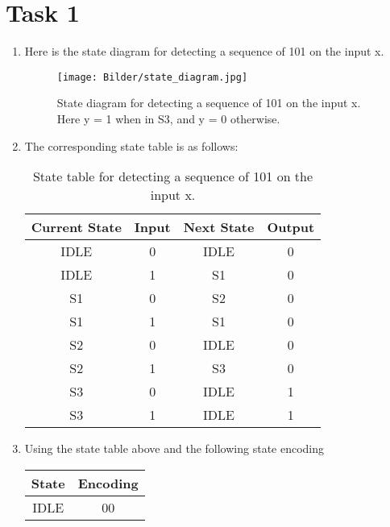 \documentclass[a4paper,11pt,norsk]{article}
\begin{document}


\section*{Task 1}
\begin{enumerate}
    \item Here is the state diagram for detecting a sequence of 101 on the input x.
        \begin{figure}[H]
            \centering
            \texttt{[image: Bilder/state\_diagram.jpg]}
            \caption{State diagram for detecting a sequence of 101 on the input x. Here y = 1 when in S3, and y = 0 otherwise.}
            \label{fig:Task1_1}
        \end{figure}
    \item The corresponding state table is as follows:
        \begin{table}[H]
            \centering
            \begin{tabular}{|c|c|c|c|}
                \hline
                \textbf{Current State} & \textbf{Input} & \textbf{Next State} & \textbf{Output} \\ \hline
                IDLE & 0 & IDLE & 0 \\ \hline
                IDLE & 1 & S1   & 0 \\ \hline
                S1   & 0 & S2   & 0 \\ \hline
                S1   & 1 & S1   & 0 \\ \hline
                S2   & 0 & IDLE & 0 \\ \hline
                S2   & 1 & S3   & 0 \\ \hline
                S3   & 0 & IDLE & 1 \\ \hline
                S3   & 1 & IDLE & 1 \\ \hline
            \end{tabular}
            \caption{State table for detecting a sequence of 101 on the input x.}
            \label{tab:Task1_2}
        \end{table}
    \item Using the state table above and the following state encoding
        \begin{table}[H]
            \centering
            \begin{tabular}{|c|c|}
                \hline
                \textbf{State} & \textbf{Encoding} \\ \hline
                IDLE & 00 \\ \hline

\end{tabular}
\end{table}
\end{enumerate}
\end{document}
